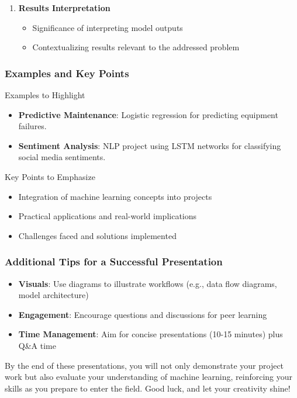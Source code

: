 \documentclass[aspectratio=169]{beamer}
\begin{document}
\begin{frame}[fragile]
\begin{enumerate}
        \item \textbf{Results Interpretation}
            \begin{itemize}
                \item Significance of interpreting model outputs
                \item Contextualizing results relevant to the addressed problem
            \end{itemize}
    \end{enumerate}
\end{frame}

\begin{frame}[fragile]
    \frametitle{Examples and Key Points}
    \begin{block}{Examples to Highlight}
        \begin{itemize}
            \item \textbf{Predictive Maintenance}: Logistic regression for predicting equipment failures.
            \item \textbf{Sentiment Analysis}: NLP project using LSTM networks for classifying social media sentiments.
        \end{itemize}
    \end{block}
    
    \begin{block}{Key Points to Emphasize}
        \begin{itemize}
            \item Integration of machine learning concepts into projects
            \item Practical applications and real-world implications
            \item Challenges faced and solutions implemented
        \end{itemize}
    \end{block}
\end{frame}

\begin{frame}[fragile]
    \frametitle{Additional Tips for a Successful Presentation}
    \begin{itemize}
        \item \textbf{Visuals}: Use diagrams to illustrate workflows (e.g., data flow diagrams, model architecture)
        \item \textbf{Engagement}: Encourage questions and discussions for peer learning
        \item \textbf{Time Management}: Aim for concise presentations (10-15 minutes) plus Q\&A time
    \end{itemize}
    
    By the end of these presentations, you will not only demonstrate your project work but also evaluate your understanding of machine learning, reinforcing your skills as you prepare to enter the field. Good luck, and let your creativity shine!
\end{frame}
\end{document}
